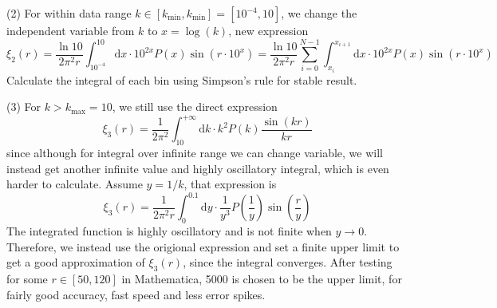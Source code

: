 \documentclass[12pt, graphicx]{article}
\begin{document}
(2) For within data range $k\in[k_\mathrm{min},k_\mathrm{min}]=[10^{-4},10]$, we change the independent variable from $k$ to $x=\log(k)$, new expression 
\begin{equation}
\xi_2(r)=\frac{\ln 10}{2\pi^2r}\int_{10^{-4}}^{10}\mathrm{d}x\cdot 10^{2x}P(x)\sin(r\cdot 10^x)=\frac{\ln 10}{2\pi^2r}\displaystyle\sum_{i=0}^{N-1}\int_{x_i}^{x_{i+1}}\mathrm{d}x\cdot 10^{2x}P(x)\sin(r\cdot 10^x)
\end{equation}
Calculate the integral of each bin using Simpson's rule for stable result.\par

(3) For $k>k_\mathrm{max}=10$, we still use the direct expression
\begin{equation}
\xi_3(r)=\frac{1}{2\pi^2}\int_{10}^{+\infty}\mathrm{d}k\cdot k^2P(k)\frac{\sin(kr)}{kr}
\end{equation}
since although for integral over infinite range we can change variable, we will instead get another infinite value and highly oscillatory integral, which is even harder to calculate. Assume $y=1/k$, that expression is 
\begin{equation}
\xi_3(r)=\frac{1}{2\pi^2r}\int_0^{0.1}\mathrm{d}y\cdot \frac{1}{y^3}P(\frac{1}{y})\sin(\frac{r}{y})
\end{equation}
The integrated function is highly oscillatory and is not finite when $y\to 0$. Therefore, we instead use the origional expression and set a finite upper limit to get a good approximation of $\xi_3(r)$, since the integral converges. After testing for some $r\in[50,120]$ in Mathematica, 5000 is chosen to be the upper limit, for fairly good accuracy, fast speed and less error spikes. 
\end{document}
